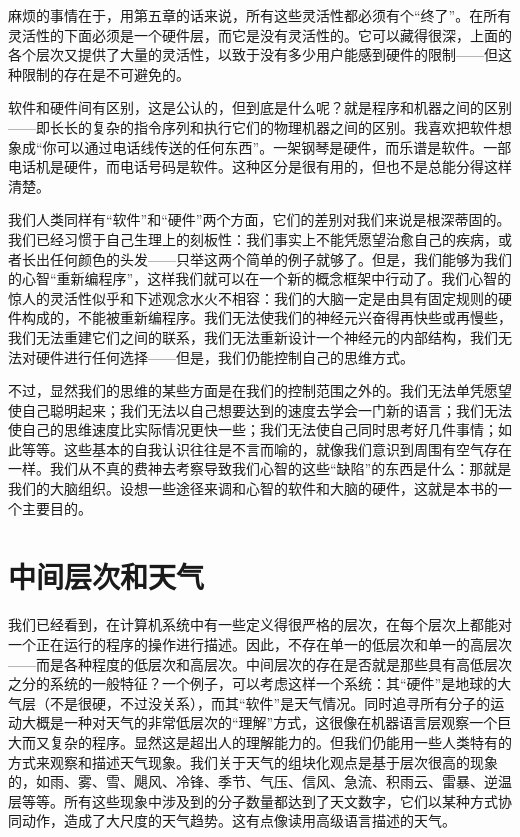 麻烦的事情在于，用第五章的话来说，所有这些灵活性都必须有个“终了”。在所有灵活性的下面必须是一个硬件层，而它是没有灵活性的。它可以藏得很深，上面的各个层次又提供了大量的灵活性，以致于没有多少用户能感到硬件的限制——但这种限制的存在是不可避免的。

软件和硬件间有区别，这是公认的，但到底是什么呢？就是程序和机器之间的区别——即长长的复杂的指令序列和执行它们的物理机器之间的区别。我喜欢把软件想象成“你可以通过电话线传送的任何东西”。一架钢琴是硬件，而乐谱是软件。一部电话机是硬件，而电话号码是软件。这种区分是很有用的，但也不是总能分得这样清楚。

我们人类同样有“软件”和“硬件”两个方面，它们的差别对我们来说是根深蒂固的。我们已经习惯于自己生理上的刻板性：我们事实上不能凭愿望治愈自己的疾病，或者长出任何颜色的头发——只举这两个简单的例子就够了。但是，我们能够为我们的心智“重新编程序”，这样我们就可以在一个新的概念框架中行动了。我们心智的惊人的灵活性似乎和下述观念水火不相容：我们的大脑一定是由具有固定规则的硬件构成的，不能被重新编程序。我们无法使我们的神经元兴奋得再快些或再慢些，我们无法重建它们之间的联系，我们无法重新设计一个神经元的内部结构，我们无法对硬件进行任何选择——但是，我们仍能控制自己的思维方式。

不过，显然我们的思维的某些方面是在我们的控制范围之外的。我们无法单凭愿望使自己聪明起来；我们无法以自己想要达到的速度去学会一门新的语言；我们无法使自己的思维速度比实际情况更快一些；我们无法使自己同时思考好几件事情；如此等等。这些基本的自我认识往往是不言而喻的，就像我们意识到周围有空气存在一样。我们从不真的费神去考察导致我们心智的这些“缺陷”的东西是什么：那就是我们的大脑组织。设想一些途径来调和心智的软件和大脑的硬件，这就是本书的一个主要目的。

\section{中间层次和天气}

我们已经看到，在计算机系统中有一些定义得很严格的层次，在每个层次上都能对一个正在运行的程序的操作进行描述。因此，不存在单一的低层次和单一的高层次——而是各种程度的低层次和高层次。中间层次的存在是否就是那些具有高低层次之分的系统的一般特征？一个例子，可以考虑这样一个系统：其“硬件”是地球的大气层（不是很硬，不过没关系），而其“软件”是天气情况。同时追寻所有分子的运动大概是一种对天气的非常低层次的“理解”方式，这很像在机器语言层观察一个巨大而又复杂的程序。显然这是超出人的理解能力的。但我们仍能用一些人类特有的方式来观察和描述天气现象。我们关于天气的组块化观点是基于层次很高的现象的，如雨、雾、雪、飓风、冷锋、季节、气压、信风、急流、积雨云、雷暴、逆温层等等。所有这些现象中涉及到的分子数量都达到了天文数字，它们以某种方式协同动作，造成了大尺度的天气趋势。这有点像读用高级语言描述的天气。

